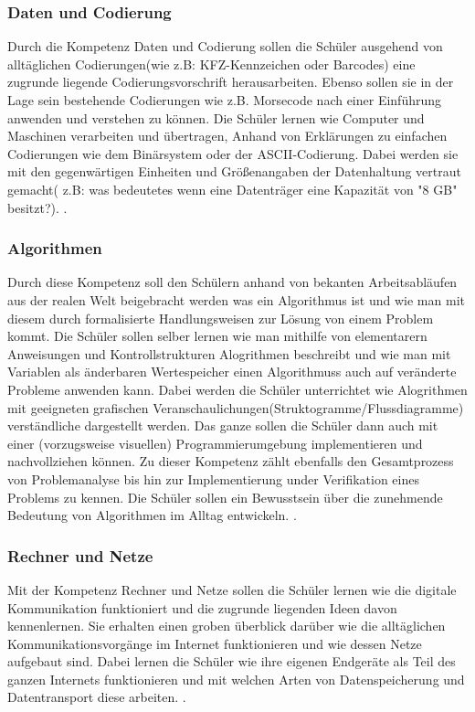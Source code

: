 \subsubsection{Daten und Codierung}

Durch die Kompetenz Daten und Codierung sollen die Schüler ausgehend von alltäglichen Codierungen(wie z.B: KFZ-Kennzeichen oder Barcodes) eine zugrunde liegende Codierungsvorschrift herausarbeiten. Ebenso sollen sie in der Lage sein bestehende Codierungen wie z.B. Morsecode nach einer Einführung anwenden und verstehen zu können. Die Schüler lernen wie Computer und Maschinen verarbeiten und übertragen, Anhand von Erklärungen zu einfachen Codierungen wie dem Binärsystem oder der ASCII-Codierung. Dabei werden sie mit den gegenwärtigen Einheiten und Größenangaben der Datenhaltung vertraut gemacht( z.B: was bedeutetes wenn eine Datenträger eine Kapazität von "8 GB" besitzt?). \cite{Daten}.

\subsubsection{Algorithmen}

Durch diese Kompetenz soll den Schülern anhand von bekanten Arbeitsabläufen aus der realen Welt beigebracht werden was ein Algorithmus ist und wie man mit diesem durch formalisierte Handlungsweisen zur Lösung von einem Problem kommt. Die Schüler sollen selber lernen wie man mithilfe von elementarern Anweisungen und Kontrollstrukturen Alogrithmen beschreibt und wie man mit Variablen als änderbaren Wertespeicher einen Algorithmuss auch auf veränderte Probleme anwenden kann. Dabei werden die Schüler unterrichtet wie Alogrithmen mit geeigneten grafischen Veranschaulichungen(Struktogramme/Flussdiagramme) verständliche dargestellt werden. Das ganze sollen die Schüler dann auch mit einer (vorzugsweise visuellen) Programmierumgebung implementieren und nachvollziehen können. Zu dieser Kompetenz zählt ebenfalls den Gesamtprozess von Problemanalyse bis hin zur Implementierung under Verifikation eines Problems zu kennen. Die Schüler sollen ein Bewusstsein über die zunehmende Bedeutung von Algorithmen im Alltag entwickeln.
\cite{Algo}.

\subsubsection{Rechner und Netze}

Mit der Kompetenz Rechner und Netze sollen die Schüler lernen wie die digitale Kommunikation funktioniert und die zugrunde liegenden Ideen davon kennenlernen. Sie erhalten einen groben überblick darüber wie die alltäglichen Kommunikationsvorgänge im Internet funktionieren und wie dessen Netze aufgebaut sind. Dabei lernen die Schüler wie ihre eigenen Endgeräte als Teil des ganzen Internets funktionieren und mit welchen Arten von Datenspeicherung und Datentransport diese arbeiten.
\cite{Rechner}.

